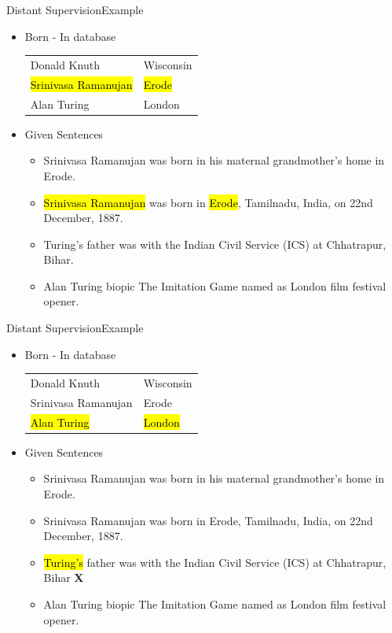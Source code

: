 \documentclass{beamer}
\makeatletter
\newcommand\SoulColor{%
  \let\set@color\beamerorig@set@color
  \let\reset@color\beamerorig@reset@color}
\makeatother
\begin{document}
\begin{frame}{Distant Supervision}{Example}
\begin{itemize}
 
\item Born - In database
 \begin{center}
\begin{tabular}{|l|l|}
\hline
Donald Knuth & Wisconsin \\
\SoulColor\hl{Srinivasa Ramanujan} & \SoulColor\hl{Erode} \\
Alan Turing & London \\
\hline
\end{tabular}
\end{center}
\item Given Sentences
\begin{itemize}
\item Srinivasa Ramanujan was born in his maternal grandmother’s home in Erode.  \checkmark
\item \alert<+> {\SoulColor\hl{Srinivasa Ramanujan} was born in \SoulColor\hl{Erode}, Tamilnadu, India, on 22nd December, 1887.}  \checkmark
\item Turing's father was with the Indian Civil Service (ICS) at Chhatrapur, Bihar.
\item Alan Turing biopic The Imitation Game named as London film festival opener.
\end{itemize}
\end{itemize}
\end{frame}
\begin{frame}{Distant Supervision}{Example}
\begin{itemize}
 
\item Born - In database
 \begin{center}
\begin{tabular}{|l|l|}
\hline
Donald Knuth & Wisconsin \\
Srinivasa Ramanujan & Erode \\
\SoulColor\hl{Alan Turing} & \SoulColor\hl{London} \\
\hline
\end{tabular}
\end{center}
\item Given Sentences
\begin{itemize}
\item Srinivasa Ramanujan was born in his maternal grandmother’s home in Erode.  \checkmark
\item Srinivasa Ramanujan was born in Erode, Tamilnadu, India, on 22nd December, 1887.  \checkmark
\item \alert<+> {\SoulColor\hl{Turing's} father was with the Indian Civil Service (ICS) at Chhatrapur, Bihar}  \textbf{X}
\item Alan Turing biopic The Imitation Game named as London film festival opener.
\end{itemize}
\end{itemize}
\end{frame}
\end{document}
